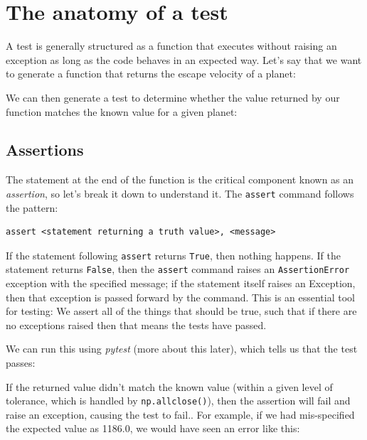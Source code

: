 \section{The anatomy of a test}

A test is generally structured as a function that executes without raising an exception as long as the code behaves in an expected way.
Let's say that we want to generate a function that returns the escape velocity of a planet:



We can then generate a test to determine whether the value returned by our function matches the known value for a given planet:



\subsection{Assertions}

The statement at the end of the function is the critical component known as an \textit{assertion}, so let's break it down to understand it. The \texttt{assert} command follows the pattern: 

\begin{lstlisting}[style=Pythonshort]
assert <statement returning a truth value>, <message>
\end{lstlisting}

If the statement following \texttt{assert} returns \texttt{True}, then nothing happens.  If the statement returns \texttt{False}, then the \texttt{assert} command raises an \texttt{AssertionError} exception with the specified message; if the statement itself raises an Exception, then that exception is passed forward by the command.  This is an essential tool for testing: We assert all of the things that should be true, such that if there are no exceptions raised then that means the tests have passed.

We can run this using \textit{pytest} (more about this later), which tells us that the test passes:



If the returned value didn't match the known value (within a given level of tolerance, which is handled by \texttt{np.allclose()}), then the assertion will fail and raise an exception, causing the test to fail.. 
For example, if we had mis-specified the expected value as 1186.0, we would have seen an error like this:

